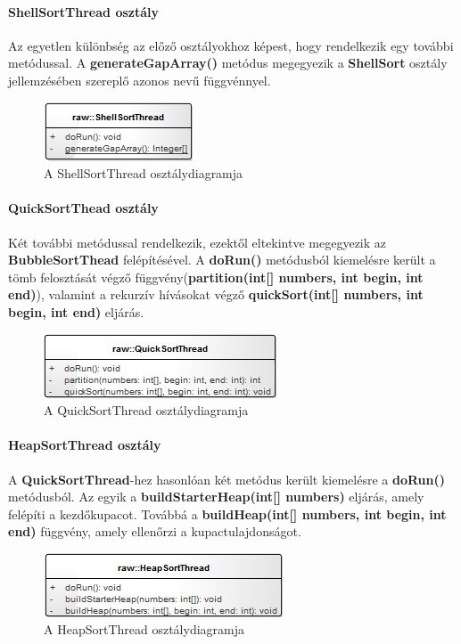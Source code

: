 \documentclass{elteikthesis}
\begin{document}
\paragraph{ShellSortThread osztály}
Az egyetlen különbség az előző osztályokhoz képest, hogy rendelkezik egy további metódussal. A \textbf{generateGapArray()} metódus megegyezik a \textbf{ShellSort} osztály jellemzésében szereplő azonos nevű függvénnyel.
\begin{figure}[H]
	\centering
	\includegraphics{pics/class/ShellSortThread.png}
	\caption{A ShellSortThread osztálydiagramja}
\end{figure}
\paragraph{QuickSortThead osztály}
Két további metódussal rendelkezik, ezektől eltekintve megegyezik az \textbf{BubbleSortThead} felépítésével. A \textbf{doRun()} metódusból kiemelésre került a tömb felosztását végző függvény(\textbf{partition(int[] numbers, int begin, int end)}), valamint a rekurzív hívásokat végző \textbf{quickSort(int[] numbers, int begin, int end)} eljárás.
\begin{figure}[H]
	\centering
	\includegraphics{pics/class/QuickSortThread.png}
	\caption{A QuickSortThread osztálydiagramja}
\end{figure}
\paragraph{HeapSortThread osztály}
A \textbf{QuickSortThread}-hez hasonlóan két metódus került kiemelésre a \textbf{doRun()} metódusból. Az egyik a \textbf{buildStarterHeap(int[] numbers)} eljárás, amely felépíti a kezdőkupacot. Továbbá a \textbf{buildHeap(int[] numbers, int begin, int end)} függvény, amely ellenőrzi a kupactulajdonságot.
\begin{figure}[H]
	\centering
	\includegraphics{pics/class/HeapSortThread.png}
	\caption{A HeapSortThread osztálydiagramja}
\end{figure}
\end{document}
